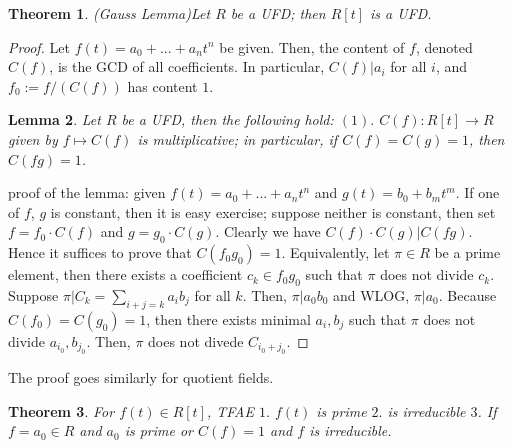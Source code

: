 \documentclass{article}
\newtheorem{theorem}{Theorem}[section]
\newtheorem{lemma}[theorem]{Lemma}
\theoremstyle{definition}
\theoremstyle{definition}
\begin{document}
\begin{theorem}
    (Gauss Lemma)Let $R$ be a UFD; then $R[t]$ is a UFD. 
\end{theorem}
\begin{proof}
    Let $f(t)=a_0+...+a_nt^n$ be given. Then, the content of $f$, denoted $C(f)$, is the GCD of all coefficients. In particular, $C(f)|a_i$ for all $i$, and $f_0:=f/(C(f))$ has content $1$. 
\begin{lemma}
    Let $R$ be a UFD, then the following hold: $(1).$ $C(f): R[t]\to R$ given by $f\mapsto C(f)$ is multiplicative; in particular, if $C(f)=C(g)=1$, then $C(fg)=1$. 
\end{lemma}
proof of the lemma: given $f(t)=a_0+...+a_nt^n$ and $g(t)=b_0+b_mt^m$. If one of $f$, $g$ is constant, then it is easy exercise; suppose neither is constant, then set $f=f_0\cdot C(f)$ and $g=g_0\cdot C(g)$. Clearly we have $C(f)\cdot C(g)| C(fg)$. Hence it suffices to prove that $C(f_0g_0)=1$. Equivalently, let $\pi\in R$ be a prime element, then there exists a coefficient $c_k\in f_0g_0$ such that $\pi$ does not divide $c_k$. Suppose $\pi| C_k=\sum_{i+j=k}a_ib_j$ for all $k$. Then, $\pi|a_0b_0$ and WLOG, $\pi|a_0$. Because $C(f_0)=C(g_0)=1$, then there exists minimal $a_i,b_j$ such that $\pi$ does not divide $a_{i_0},b_{j_0}$. Then, $\pi$ does not divede $C_{i_0+j_0}$.

\end{proof}
The proof goes similarly for quotient fields. 
\begin{theorem}
    For $f(t)\in R[t]$, TFAE
    $1.$ $f(t)$ is prime
    $2.$ is irreducible
    $3$. If $f=a_0\in R$ and $a_0$ is prime or $C(f)=1$ and $f$ is irreducible. 
\end{theorem}
\end{document}

